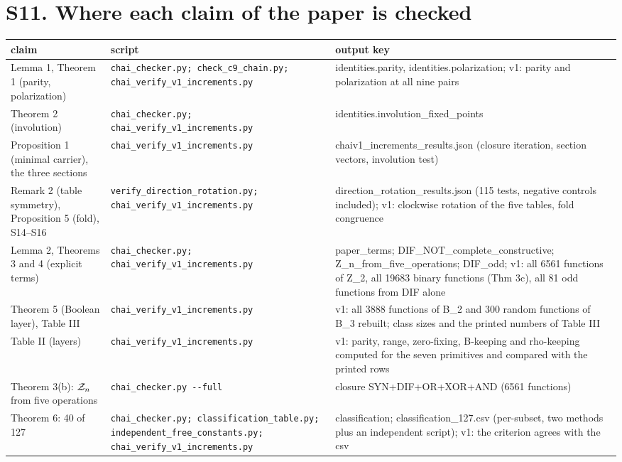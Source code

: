 \documentclass[10pt,a4paper]{article}
\begin{document}
\section*{S11. Where each claim of the paper is checked}
\begin{center}\scriptsize\begin{longtable}{>{\raggedright\arraybackslash}p{4.6cm}>{\raggedright\arraybackslash}p{5.2cm}>{\raggedright\arraybackslash}p{6.2cm}}\toprule claim&script&output key\\\midrule\endhead
Lemma 1, Theorem 1 (parity, polarization)&\texttt{chai\_checker.py; \allowbreak check\_c9\_chain.py; \allowbreak chai\_verify\_v1\_increments.py}&identities.parity, identities.polarization; v1: parity and polarization at all nine pairs\\
Theorem 2 (involution)&\texttt{chai\_checker.py; \allowbreak chai\_verify\_v1\_increments.py}&identities.involution\_fixed\_points\\
Proposition 1 (minimal carrier), the three sections&\texttt{chai\_verify\_v1\_increments.py}&chaiv1\_increments\_results.json (closure iteration, section vectors, involution test)\\
Remark 2 (table symmetry), Proposition 5 (fold), S14--S16&\texttt{verify\_direction\_rotation.py; \allowbreak chai\_verify\_v1\_increments.py}&direction\_rotation\_results.json (115 tests, negative controls included); v1: clockwise rotation of the five tables, fold congruence\\
Lemma 2, Theorems 3 and 4 (explicit terms)&\texttt{chai\_checker.py; \allowbreak chai\_verify\_v1\_increments.py}&paper\_terms; DIF\_NOT\_complete\_constructive; Z\_n\_from\_five\_operations; DIF\_odd; v1: all 6561 functions of Z\_2, all 19683 binary functions (Thm 3c), all 81 odd functions from DIF alone\\
Theorem 5 (Boolean layer), Table III&\texttt{chai\_verify\_v1\_increments.py}&v1: all 3888 functions of B\_2 and 300 random functions of B\_3 rebuilt; class sizes and the printed numbers of Table III\\
Table II (layers)&\texttt{chai\_verify\_v1\_increments.py}&v1: parity, range, zero-fixing, B-keeping and rho-keeping computed for the seven primitives and compared with the printed rows\\
Theorem 3(b): $\mathcal Z_n$ from five operations&\texttt{chai\_checker.py -{}-full}&closure SYN+DIF+OR+XOR+AND (6561 functions)\\
Theorem 6: 40 of 127&\texttt{chai\_checker.py; \allowbreak classification\_table.py; \allowbreak independent\_free\_constants.py; \allowbreak chai\_verify\_v1\_increments.py}&classification; classification\_127.csv (per-subset, two methods plus an independent script); v1: the criterion agrees with the csv\\

\end{longtable}
\end{center}
\end{document}

